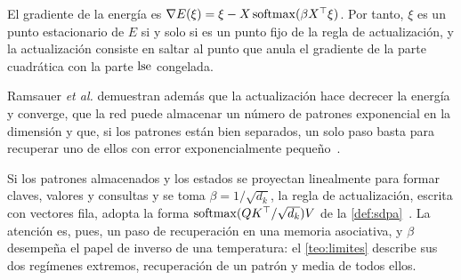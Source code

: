 \begin{proposicion}\label{prop:hopfield}
El gradiente de la energía es $\nabla E(\xi)=\xi-X\operatorname{softmax}(\beta X^{\top}\xi)$. Por tanto, $\xi$ es un punto estacionario de $E$ si y solo si es un punto fijo de la regla de actualización, y la actualización consiste en saltar al punto que anula el gradiente de la parte cuadrática con la parte $\operatorname{lse}$ congelada.
\end{proposicion}

Ramsauer \emph{et al.} demuestran además que la actualización hace decrecer la energía y converge, que la red puede almacenar un número de patrones exponencial en la dimensión y que, si los patrones están bien separados, un solo paso basta para recuperar uno de ellos con error exponencialmente pequeño~\cite[§2, teoremas~1 a~5]{ramsauer}.

\begin{observacion}
Si los patrones almacenados y los estados se proyectan linealmente para formar claves, valores y consultas y se toma $\beta=1/\sqrt{d_k}$, la regla de actualización, escrita con vectores fila, adopta la forma $\operatorname{softmax}(QK^{\top}/\sqrt{d_k})V$ de la \cref{def:sdpa}~\cite[§2]{ramsauer}. La atención es, pues, un paso de recuperación en una memoria asociativa, y $\beta$ desempeña el papel de inverso de una temperatura: el \cref{teo:limites} describe sus dos regímenes extremos, recuperación de un patrón y media de todos ellos.
\end{observacion}

